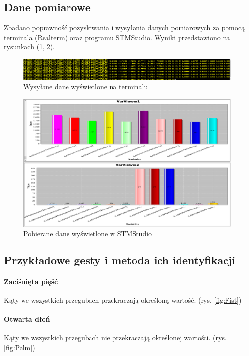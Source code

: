 \documentclass[12pt,a4paper]{article}
\begin{document}
\subsection{Dane pomiarowe}
Zbadano poprawność pozyskiwania i wysyłania danych pomiarowych za pomocą terminala (Realterm) oraz programu STMStudio. Wyniki przedstawiono na rysunkach (\ref{fig:term}, \ref{fig:stmstudio}).\\
\begin{figure}
\centering
\includegraphics[width=\textwidth]{./images/terminal.png}
\caption{Wysyłane dane wyświetlone na terminalu \label{fig:term}}
\end{figure}
\begin{figure}
\centering
\includegraphics[width=\textwidth]{./images/stmstudio.png}
\caption{Pobierane dane wyświetlone w STMStudio\label{fig:stmstudio}}
\end{figure}

\subsection{Przykładowe gesty i metoda ich identyfikacji}
\paragraph{Zaciśnięta pięść}
Kąty we wszystkich przegubach przekraczają określoną wartość. (rys. \ref{fig:Fist})
\paragraph{Otwarta dłoń}
Kąty we wszystkich przegubach nie przekraczają określonej wartości. (rys. \ref{fig:Palm})
\end{document}

